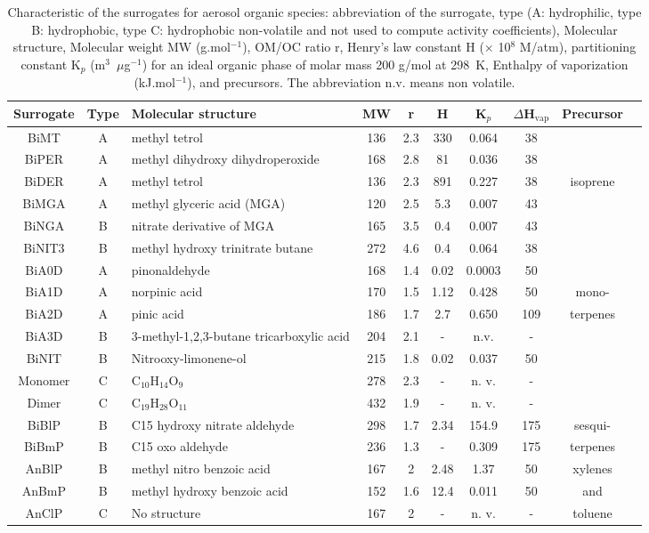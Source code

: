 \documentclass[a4paper,11pt]{article}
\begin{document}
\begin{footnotesize}
\begin{table}
\caption{Characteristic of the surrogates for aerosol organic species: abbreviation of the surrogate, type 	
	(A: hydrophilic, type B: hydrophobic, type C: hydrophobic non-volatile and not used to compute activity coefficients),
	Molecular structure, Molecular weight MW (g.mol$^{-1}$), OM/OC ratio r, Henry's law constant H ($\times$ 10$^8$ M/atm), partitioning constant K$_p$
(m$^3$~$\mu$g$^{-1}$) for an ideal organic phase of molar mass 200 g/mol at 298~K, Enthalpy of vaporization (kJ.mol$^{-1}$), and precursors. The abbreviation n.v. means non volatile.}
\centering
\begin{tabular}{|c|c|p{3.8cm}|c|c|c|c|c|c|c}
\hline
	Surrogate & Type & Molecular structure& MW & r & H  & K$_p$ & $\Delta$H$_{\mathrm{vap}}$ & Precursor \\
\hline
	BiMT & A & methyl tetrol & 136 & 2.3 & 330 & 0.064 & 38 &  \\
	BiPER & A & methyl dihydroxy dihydroperoxide & 168 & 2.8 & 81 & 0.036 & 38 &  \\
	BiDER & A & methyl tetrol & 136 & 2.3 & 891 & 0.227 & 38 & isoprene \\
	BiMGA & A & methyl glyceric acid (MGA) & 120 & 2.5 & 5.3 & 0.007 & 43 & \\
	BiNGA & B & nitrate derivative of MGA & 165 & 3.5 & 0.4 & 0.007 & 43 & \\
	BiNIT3 & B & methyl hydroxy trinitrate butane & 272 & 4.6 & 0.4 & 0.064 & 38 &  \\
\hline
	BiA0D & A & pinonaldehyde & 168 & 1.4 & 0.02 & 0.0003 & 50 & \\
	BiA1D & A & norpinic acid & 170 & 1.5 & 1.12 & 0.428 & 50 & mono- \\
	BiA2D & A & pinic acid & 186 & 1.7 & 2.7 & 0.650 & 109 & terpenes\\
	BiA3D & B & 3-methyl-1,2,3-butane tricarboxylic acid & 204 & 2.1  & - & n.v. & - &\\
	BiNIT & B & Nitrooxy-limonene-ol & 215 & 1.8 & 0.02 & 0.037 & 50 & \\
	Monomer & C & C$_{10}$H$_{14}$O$_9$ & 278 & 2.3 & - & n. v. & - &\\
	Dimer & C & C$_{19}$H$_{28}$O$_{11}$ & 432 & 1.9 & - & n. v. & - & \\
\hline
	BiBlP & B & C15 hydroxy nitrate aldehyde & 298 & 1.7 & 2.34 & 154.9 & 175 & sesqui- \\
	BiBmP & B & C15 oxo aldehyde & 236 &1.3 & - & 0.309 & 175 & terpenes \\ 
\hline
	AnBlP & B & methyl nitro benzoic acid & 167 & 2 & 2.48 & 1.37 & 50 &     xylenes\\
	AnBmP & B & methyl hydroxy benzoic acid & 152 & 1.6 & 12.4 & 0.011 & 50 & and\\
	AnClP & C & No structure & 167 & 2 & - & n. v. & - & toluene\\
\end{tabular}
\label{species}
\end{table}



\end{footnotesize}
\end{document}
